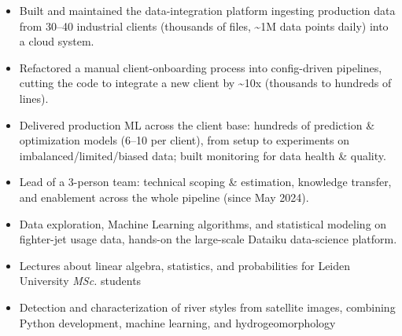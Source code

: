 \documentclass[10pt,a4paper]{altacv}
\begin{document}

\begin{itemize}
\item Built and maintained the data-integration platform ingesting production data from 30--40 industrial clients (thousands of files, \textasciitilde1M data points daily) into a cloud system.
\item Refactored a manual client-onboarding process into config-driven pipelines, cutting the code to integrate a new client by \textasciitilde10x (thousands to hundreds of lines).
\item Delivered production ML across the client base: hundreds of prediction \& optimization models (6--10 per client), from setup to experiments on imbalanced/limited/biased data; built monitoring for data health \& quality.
\item Lead of a 3-person team: technical scoping \& estimation, knowledge transfer, and enablement across the whole pipeline (since May 2024).
\end{itemize}

\divider


\begin{itemize}
\item Data exploration, Machine Learning algorithms, and statistical modeling on fighter-jet usage data, hands-on the large-scale Dataiku data-science platform.
\end{itemize}
\divider


\begin{itemize}
\item Lectures about linear algebra, statistics, and probabilities for Leiden University \textit{MSc.} students
\end{itemize}
\divider


\begin{itemize}
\item Detection and characterization of river styles from satellite images, combining Python development, machine learning, and hydrogeomorphology
\end{itemize}
\divider
\end{document}
